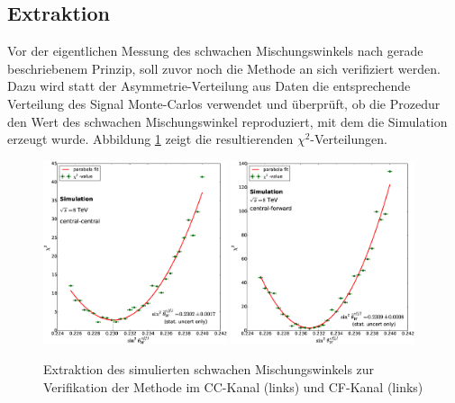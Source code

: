 \subsection{Extraktion}
\label{afb:extraction}


Vor der eigentlichen Messung des schwachen Mischungswinkels nach gerade
beschriebenem Prinzip, soll zuvor noch die Methode an sich verifiziert werden.
Dazu wird statt der Asymmetrie-Verteilung aus Daten die entsprechende
Verteilung des Signal Monte-Carlos verwendet und überprüft, ob die Prozedur den
Wert des schwachen Mischungswinkel reproduziert, mit dem die Simulation erzeugt
wurde. Abbildung \ref{fig:closure} zeigt die resultierenden
$\chi^2$-Verteilungen.

\begin{figure}[h]
    \centering
    \includegraphics[width=0.48\textwidth]{plots/sin2theta_cc_closure}
    \hfill
    \includegraphics[width=0.48\textwidth]{plots/sin2theta_cf_closure}
    \caption[Extraktion des simulierten schwachen Mischungswinkels zur
        Verifikation der Methode]
        {Extraktion des simulierten schwachen Mischungswinkels zur
        Verifikation der Methode im \ac{CC}-Kanal (links) und \ac{CF}-Kanal
        (links)}
    \label{fig:closure}
\end{figure}

